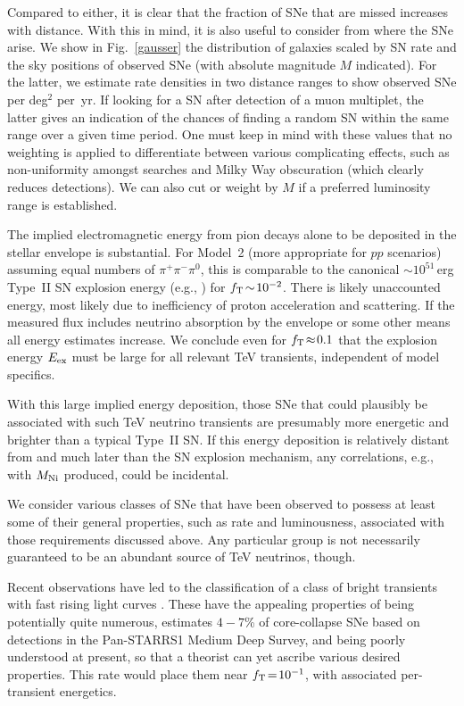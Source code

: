 \documentclass[aps,prd,nofootinbib,twocolumn,floatfix,letterpaper,superscriptaddress,showpacs]{revtex4}
\begin{document}
Compared to either, it is clear that the fraction of SNe that are missed increases with distance.
With this in mind, it is also useful to consider from where the SNe arise.  We show in Fig.~\ref{gausser} the distribution of galaxies scaled by SN rate and the sky positions of observed SNe (with absolute magnitude $M$ indicated).  For the latter, we estimate rate densities \cite{Yuksel2012} in two distance ranges to show observed SNe per deg$^2$ per~yr.  If looking for a SN after detection of a muon multiplet, the latter gives an indication of the chances of finding a random SN within the same range over a given time period.
One must keep in mind with these values that no weighting is applied to differentiate between various complicating effects, such as non-uniformity amongst searches and Milky Way obscuration (which clearly reduces detections).
We can also cut or weight by $M$ if a preferred luminosity range is established.

The implied electromagnetic energy from pion decays alone to be deposited in the stellar envelope is substantial.
For Model~2 (more appropriate for $pp$ scenarios) assuming equal numbers of $\pi^+$$\pi^-$$\pi^0$, this is comparable to the canonical $\sim\!10^{51}\,$erg Type~II SN explosion energy (e.g., \cite{Rubin2015}) for $f_{\rm T} \!\sim\! 10^{-2}$.  There is likely unaccounted energy, most likely due to inefficiency of proton acceleration and scattering.  If the measured flux includes neutrino absorption by the envelope or some other means all energy estimates increase.
We conclude even for $f_{\rm T} \!\approx\! 0.1$ that the explosion energy $E_{\rm ex}$ must be large for all relevant TeV transients, independent of model specifics.

With this large implied energy deposition, those SNe that could plausibly be associated with such TeV neutrino transients are presumably more energetic and brighter than a typical Type~II SN.  If this energy deposition is relatively distant from and much later than the SN explosion mechanism, any correlations, e.g., with $M_{\rm Ni}$ produced, could be incidental.

We consider various classes of SNe that have been observed to possess at least some of their general properties, such as rate and luminousness, associated with those requirements discussed above.  Any particular group is not necessarily guaranteed to be an abundant source of TeV neutrinos, though.

Recent observations have led to the classification of a class of bright transients with fast rising light curves \cite{Drout:2014dma,Arcavi:2015zie}.  These have the appealing properties of being potentially quite numerous, \cite{Drout:2014dma} estimates $4 - 7$\% of core-collapse SNe based on detections in the Pan-STARRS1 Medium Deep Survey, and being poorly understood at present, so that a theorist can yet ascribe various desired properties.  This rate would place them near $f_{\rm T} \!=\! 10^{-1}$, with associated per-transient energetics.
\end{document}
